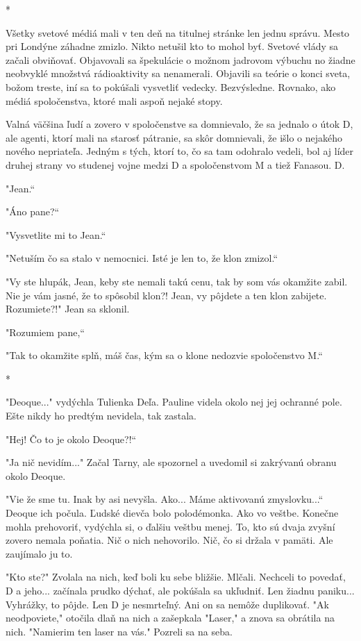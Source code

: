 \documentclass{book}
\begin{document}
\begin{center}
*
\end{center}

Všetky svetové médiá mali v ten deň na titulnej stránke len jednu správu. Mesto pri Londýne záhadne zmizlo. Nikto netušil kto to mohol byť. Svetové vlády sa začali obviňovať. Objavovali sa špekulácie o možnom jadrovom výbuchu no žiadne neobvyklé množstvá rádioaktivity sa nenamerali. Objavili sa teórie o konci sveta, božom treste, iní sa to pokúšali vysvetliť vedecky. Bezvýsledne. Rovnako, ako médiá spoločenstva, ktoré mali aspoň nejaké stopy.

Valná väčšina ľudí a zovero v spoločenstve sa domnievalo, že sa jednalo o útok D, ale agenti, ktorí mali na starosť pátranie, sa skôr domnievali, že išlo o nejakého nového nepriateľa. Jedným s tých, ktorí to, čo sa tam odohralo vedeli, bol aj líder druhej strany vo studenej vojne medzi D a spoločenstvom M a tiež Fanasou. D.

"Jean.“

"Áno pane?“

"Vysvetlite mi to Jean.“

"Netuším čo sa stalo v nemocnici. Isté je len to, že klon zmizol.“

"Vy ste hlupák, Jean, keby ste nemali takú cenu, tak by som vás okamžite zabil. Nie je vám jasné, že to spôsobil klon?! Jean, vy pôjdete a ten klon zabijete. Rozumiete?!"$ $ Jean sa sklonil.

"Rozumiem pane,“

"Tak to okamžite splň, máš čas, kým sa o klone nedozvie spoločenstvo M.“

\begin{center}
*
\end{center}

"Deoque..."$ $ vydýchla Tulienka Deľa. Pauline videla okolo nej jej ochranné pole. Ešte nikdy ho predtým nevidela, tak zastala.

"Hej! Čo to je okolo Deoque?!“

"Ja nič nevidím..."$ $ Začal Tarny, ale spozornel a uvedomil si zakrývanú obranu okolo Deoque.

"Vie že sme tu. Inak by asi nevyšla. Ako... Máme aktivovanú zmyslovku...“
Deoque ich počula. Ľudské dievča bolo polodémonka. Ako vo veštbe. Konečne mohla prehovoriť, vydýchla si, o ďalšiu veštbu menej. To, kto sú dvaja zvyšní zovero nemala poňatia. Nič o nich nehovorilo. Nič, čo si držala v pamäti. Ale zaujímalo ju to.

"Kto ste?"$ $ Zvolala na nich, keď boli ku sebe bližšie. Mlčali. Nechceli to povedať, D a jeho... začínala prudko dýchať, ale pokúšala sa ukľudniť. Len žiadnu paniku... Vyhrážky, to pôjde. Len D je nesmrteľný. Ani on sa nemôže duplikovať. "$ $Ak neodpoviete,"$ $ otočila dlaň na nich a zašepkala "Laser,"$ $ a znova sa obrátila na nich. "Namierim ten laser na vás."$ $ Pozreli sa na seba.
\end{document}
